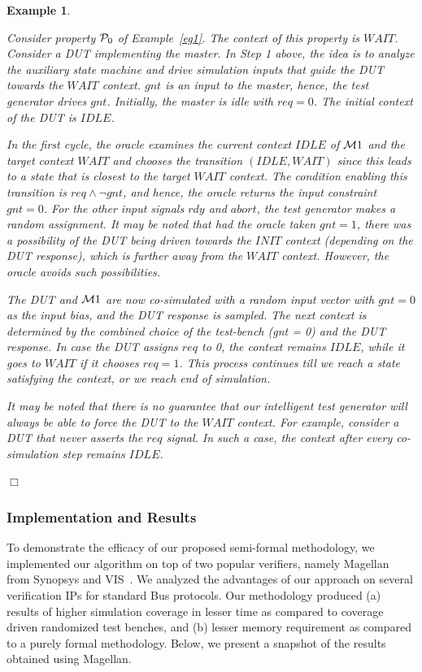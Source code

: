 \documentclass[a4paper, 11pt]{article}
\newtheorem{example}{Example} %
\begin{document}
\begin{example} \label{eg5}
{\em Consider property ${\cal P}_0$ of Example~\ref{eg1}.
The context of this property is $WAIT$. Consider a DUT implementing 
the master. In Step 1 above, the idea is to analyze the auxiliary state 
machine and drive simulation inputs 
that guide the DUT towards the $WAIT$ context. $gnt$ is an
input to the master, hence, the test generator drives $gnt$.
Initially, the master is idle with $req=0$. The initial context of 
the DUT is $IDLE$.

In the first cycle, the oracle examines the current
context $IDLE$ of ${\cal M}1$ and the target context $WAIT$ and chooses
the transition $(IDLE, WAIT)$ since this leads to a state that is closest 
to the target $WAIT$ context. The condition enabling this transition
is $req \land \neg gnt$, and hence, the oracle returns the input
constraint $gnt=0$. For the other input signals $rdy$ and $abort$, the test
generator makes a random assignment. It may be noted that had the oracle
taken $gnt=1$, there was a possibility of the DUT being driven towards
the $INIT$ context (depending on the DUT response), which is further
away from the $WAIT$ context. However, the oracle avoids such
possibilities.

The DUT and ${\cal M}1$ are now co-simulated with a random input vector with
$gnt=0$ as the input
bias, and the DUT response is sampled. The next context is determined
by the combined choice of the test-bench (gnt = 0) and the DUT response.
In case the DUT assigns $req$ to 0, the context remains
$IDLE$, while it goes to $WAIT$ if it chooses $req=1$. This process continues
till we reach a state satisfying the context, or we reach end of
simulation.

It may be noted that there is no guarantee that our intelligent test
generator will always be able to force the DUT to the $WAIT$ context. For
example, consider a DUT that never asserts the $req$ signal. In such a
case, the context after every co-simulation step remains
$IDLE$.
} $\Box$
\end{example}

\subsubsection{Implementation and Results} \label{sec5.3.1}
To demonstrate the 
efficacy of our proposed semi-formal methodology, we implemented our 
algorithm on top of two popular verifiers, namely Magellan~\cite{magellan} 
from Synopsys and VIS~\cite{vis}. We analyzed the advantages of our approach 
on several verification IPs for standard Bus protocols.
Our methodology produced (a) results of 
higher simulation coverage in lesser time as compared to coverage driven 
randomized test benches, and (b) lesser memory requirement as
compared to a purely formal methodology. Below, we present a snapshot of the 
results obtained using Magellan.
\end{document}

